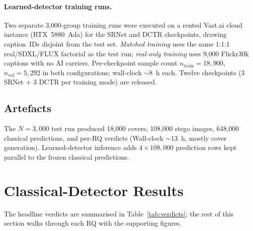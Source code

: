 \documentclass[10pt,twocolumn,a4paper]{article}
\begin{document}
\paragraph{Learned-detector training runs.} Two separate 3{,}000-group training runs were executed on a rented Vast.ai cloud instance (RTX~5880~Ada) for the SRNet and DCTR checkpoints, drawing caption~IDs disjoint from the test set. \emph{Matched training} uses the same 1:1:1 real/SDXL/FLUX factorial as the test run; \emph{real-only training} uses 9{,}000 Flickr30k captions with no AI carriers. Per-checkpoint sample count $n_\text{train}\!=\!18{,}900$, $n_\text{val}\!=\!5{,}292$ in both configurations; wall-clock $\sim\!8$~h each. Twelve checkpoints (3 SRNet + 3 DCTR per training mode) are released.

\subsection{Artefacts}
The $N\!=\!3{,}000$ test run produced 18{,}000 covers, 108{,}000 stego images, 648{,}000 classical predictions, and per-RQ verdicts (Wall-clock $\sim\!13$~h, mostly cover generation). Learned-detector inference adds $4\times108{,}000$ prediction rows kept parallel to the frozen classical predictions.

\section{Classical-Detector Results}
\label{sec:results-classical}
\label{sec:results}

The headline verdicts are summarised in Table~\ref{tab:verdicts}; the rest of this section walks through each RQ with the supporting figures.
\end{document}
